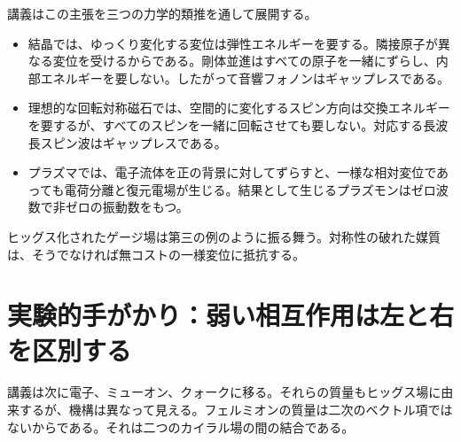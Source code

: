 講義はこの主張を三つの力学的類推を通して展開する。

\begin{itemize}
  \item 結晶では、ゆっくり変化する変位は弾性エネルギーを要する。隣接原子が異なる変位を受けるからである。剛体並進はすべての原子を一緒にずらし、内部エネルギーを要しない。したがって音響フォノンはギャップレスである。
  \item 理想的な回転対称磁石では、空間的に変化するスピン方向は交換エネルギーを要するが、すべてのスピンを一緒に回転させても要しない。対応する長波長スピン波はギャップレスである。
  \item プラズマでは、電子流体を正の背景に対してずらすと、一様な相対変位であっても電荷分離と復元電場が生じる。結果として生じるプラズモンはゼロ波数で非ゼロの振動数をもつ。
\end{itemize}

ヒッグス化されたゲージ場は第三の例のように振る舞う。対称性の破れた媒質は、そうでなければ無コストの一様変位に抵抗する。

\begin{classroomqa}
\end{classroomqa}

\begin{classroomqa}
\end{classroomqa}

\section{実験的手がかり：弱い相互作用は左と右を区別する}

講義は次に電子、ミューオン、クォークに移る。それらの質量もヒッグス場に由来するが、機構は異なって見える。フェルミオンの質量は二次のベクトル項ではないからである。それは二つのカイラル場の間の結合である。

